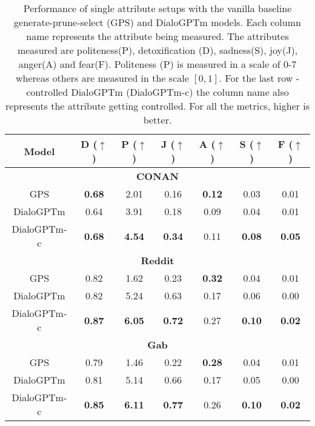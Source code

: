 \begin{table}[h!]
\centering
\scriptsize
\begin{tabular}{|c|c|c|c|c|c|c|}
\hline
\textbf{Model} & \textbf{D} ($\uparrow$)  & \textbf{P} ($\uparrow$) & \textbf{J} ($\uparrow$) & \textbf{A} ($\uparrow$) & \textbf{S} ($\uparrow$) & \textbf{F} ($\uparrow$)\\
\hline
\multicolumn{7}{|c|}{\textbf{CONAN}}                                   \\ \hline
 GPS & \textbf{0.68} & 2.01 & 0.16 & \textbf{0.12} & 0.03 & 0.01 \\
 DialoGPTm & 0.64 & 3.91 & 0.18 & 0.09 & 0.04 & 0.01\\ 
 DialoGPTm-c & \textbf{0.68} & \textbf{4.54} & \textbf{0.34} & 0.11 & \textbf{0.08} & \textbf{0.05}\\\hline 
\multicolumn{7}{|c|}{\textbf{Reddit}} \\\hline
 GPS & 0.82 & 1.62 & 0.23 &\textbf{0.32} & 0.04 & 0.01 \\
 DialoGPTm & 0.82 & 5.24 & 0.63 & 0.17 & 0.06 & 0.00\\
 DialoGPTm-c & \textbf{0.87} & \textbf{6.05} & \textbf{0.72} & 0.27 & \textbf{0.10}& \textbf{ 0.02}\\ \hline
 \multicolumn{7}{|c|}{\textbf{Gab}} \\\hline
GPS & 0.79 & 1.46 & 0.22 & \textbf{0.28} & 0.04 & 0.01 \\
DialoGPTm & 0.81 & 5.14 & 0.66 & 0.17 & 0.05 & 0.00\\
DialoGPTm-c & \textbf{0.85} & \textbf{6.11} & \textbf{0.77} & 0.26 & \textbf{0.10} & \textbf{0.02}\\
\hline
\end{tabular}
\caption{\scriptsize{Performance of single attribute setups with the vanilla baseline generate-prune-select (GPS) and  DialoGPTm models. Each column name represents the attribute being measured. The attributes measured are politeness(P), detoxification (D), sadness(S), joy(J), anger(A) and fear(F). Politeness (P) is measured in a scale of 0-7 whereas others are measured in the scale $[0,1]$. For the last row - controlled DialoGPTm (DialoGPTm-c) the column name also represents the attribute getting controlled. For all the metrics, higher is better.}}
\label{tab:control-single}
\end{table}

